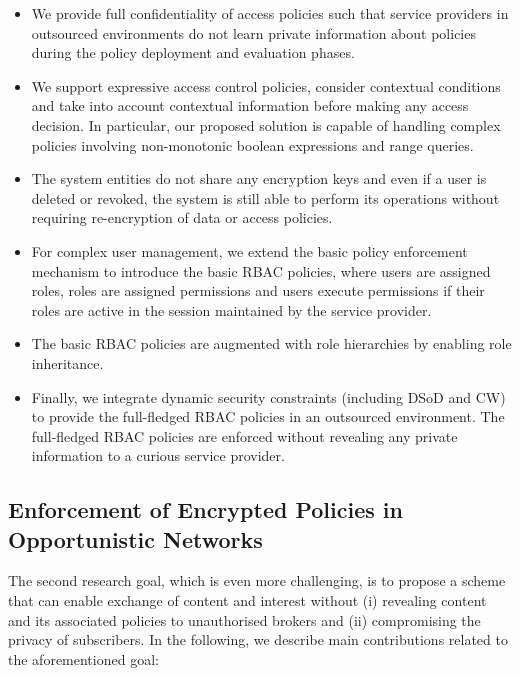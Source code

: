 \documentclass[epsfig,a4paper,11pt,titlepage]{book}
\numberwithin{algorithm}{chapter}
\begin{document}
\begin{itemize}
	
	\item We provide full confidentiality of access policies such that service providers in outsourced environments do not learn private information about policies during the policy deployment and evaluation phases.
	
	\item We support expressive access control policies, consider contextual conditions and take into account contextual information before making any access decision. In particular, our proposed solution is capable of handling complex policies involving non-monotonic boolean expressions and range queries.
	
	\item The system entities do not share any encryption keys and even if a user is deleted or revoked, the system is still able to perform its operations without requiring re-encryption of data or access policies.
	
	\item For complex user management, we extend the basic policy enforcement mechanism to introduce the basic \gls{RBAC} policies, where users are assigned roles, roles are assigned permissions and users execute permissions if their roles are active in the session maintained by the service provider.
	
	\item The basic \gls{RBAC} policies are augmented with role hierarchies by enabling role inheritance.
	
	\item Finally, we integrate dynamic security constraints (including \acrlong{DSoD} and \acrlong{CW}) to provide the full-fledged \gls{RBAC} policies in an outsourced environment. The full-fledged \gls{RBAC} policies are enforced without revealing any private information to a curious service provider.

\end{itemize}


\subsection{Enforcement of Encrypted Policies in Opportunistic Networks}
The second research goal, which is even more challenging, is to propose a scheme that can enable exchange of content and interest without (i) revealing content and its associated policies to unauthorised brokers and (ii) compromising the privacy of subscribers. In the following, we describe main contributions related to the aforementioned goal:
\end{document}
